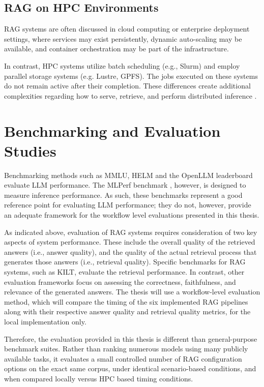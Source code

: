 \subsection{RAG on HPC Environments}

RAG systems are often discussed in cloud computing or enterprise deployment settings, where services may exist persistently, dynamic auto-scaling may be available, and container orchestration may be part of the infrastructure.

In contrast, \ac{HPC} systems utilize batch scheduling (e.g., Slurm) and employ parallel storage systems (e.g. Lustre, \acs{GPFS}). The jobs executed on these systems do not remain active after their completion. These differences create additional complexities regarding how to serve, retrieve, and perform distributed inference \cite{slurm2003,kurtzer2017singularity,dongarra2020hpcsurvey,abdolrashidi2021large}.

\section{Benchmarking and Evaluation Studies}

Benchmarking methods such as \acs{MMLU}, \acs{HELM} \cite{liang2022helm} and the OpenLLM leaderboard evaluate \ac{LLM} performance. The MLPerf benchmark \cite{reddi2020mlperf}, however, is designed to measure inference performance. As such, these benchmarks represent a good reference point for evaluating \ac{LLM} performance; they do not, however, provide an adequate framework for the workflow level evaluations presented in this thesis.

As indicated above, evaluation of \ac{RAG} systems requires consideration of two key aspects of system performance. These include the overall quality of the retrieved answers (i.e., answer quality), and the quality of the actual retrieval process that generates those answers (i.e.,  retrieval quality). Specific benchmarks for \ac{RAG} systems, such as \acs{KILT}, evaluate the retrieval performance. In contrast, other evaluation frameworks focus on assessing the correctness, faithfulness, and relevance of the generated answers. The thesis will use a workflow-level evaluation method, which will compare the timing of the six implemented \ac{RAG} pipelines along with their respective answer quality and retrieval quality metrics, for the local implementation only.

Therefore, the evaluation provided in this thesis is different than general-purpose benchmark suites. Rather than ranking numerous models using many publicly available tasks, it evaluates a small controlled number of \ac{RAG} configuration options on the exact same corpus, under identical scenario-based conditions, and when compared locally versus \acf{HPC} based timing conditions.

